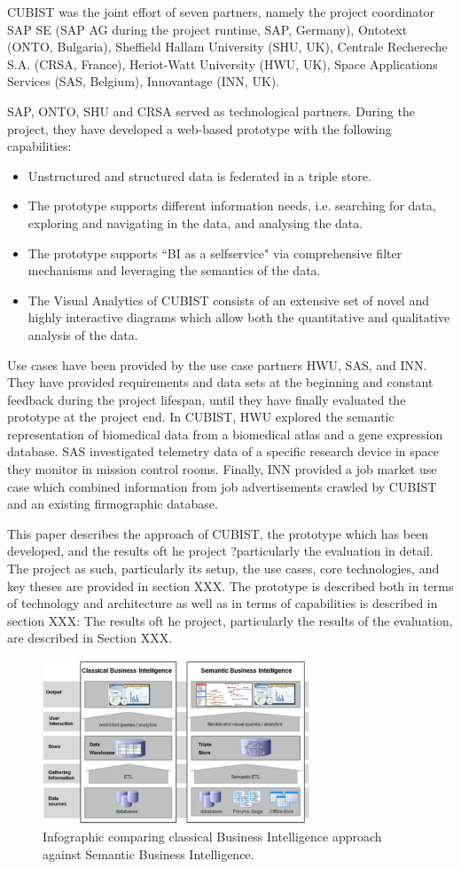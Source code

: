 CUBIST was the joint effort of seven partners, namely the project coordinator SAP SE (SAP AG during the project runtime, SAP, Germany), Ontotext (ONTO, Bulgaria), Sheffield Hallam University (SHU, UK), Centrale Rechereche S.A. (CRSA, France), Heriot-Watt University (HWU, UK), Space Applications Services (SAS, Belgium), Innovantage (INN, UK). 

SAP, ONTO, SHU and CRSA served as technological partners. During the project, they have developed a web-based prototype with the following capabilities: 
\begin{itemize}
\item Unstructured and structured data is federated in a triple store.
\item The prototype supports different information needs, i.e. searching for data, exploring and navigating in the data, and analysing the data.
\item The prototype supports ``BI as a selfservice" via comprehensive filter mechanisms and leveraging the semantics of the data.
\item The Visual Analytics of CUBIST consists of an extensive set of novel and highly interactive diagrams which allow both the quantitative and qualitative analysis of the data.
\end{itemize}

Use cases have been provided by the use case partners HWU, SAS, and INN. They have provided requirements and data sets at the beginning and constant feedback during the project lifespan, until they have finally evaluated the prototype at the project end. In CUBIST, HWU explored the semantic representation of biomedical data from a biomedical atlas and a gene expression database. SAS investigated telemetry data of a specific research device in space they monitor in mission control rooms. Finally, INN provided a job market use case which combined information from job advertisements crawled by CUBIST and an existing firmographic database.

This paper describes the approach of CUBIST, the prototype which has been developed, and the results oft he project ?particularly the evaluation in detail. The project as such, particularly its setup, the use cases, core technologies, and key theses are provided in section XXX. The prototype is described both in terms of technology and architecture as well as in terms of capabilities is described in section XXX: The results oft he project, particularly the results of the evaluation, are described in Section XXX. 

\begin{figure}[htbp]
   \centering
   \includegraphics[width=8cm]{images/classicBI_vs_semanticBI} %
   \caption{Infographic comparing classical Business Intelligence approach against Semantic Business Intelligence.}
   \label{fig:classical_v_semantic}
\end{figure}